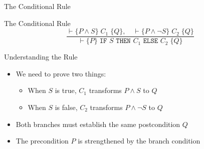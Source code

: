 \begin{frame}{The Conditional Rule}
    \begin{block}{The Conditional Rule}
        \[ \frac{\vdash \{P \wedge S\} \; C_1 \; \{Q\}, \quad \vdash \{P \wedge \neg S\} \; C_2 \; \{Q\}}{\vdash \{P\} \; \texttt{IF } S \texttt{ THEN } C_1 \texttt{ ELSE } C_2 \; \{Q\}} \]
    \end{block}
    
    \begin{block}{Understanding the Rule}
        \begin{itemize}
            \item We need to prove two things:
            \begin{itemize}
                \item When $S$ is true, $C_1$ transforms $P \wedge S$ to $Q$
                \item When $S$ is false, $C_2$ transforms $P \wedge \neg S$ to $Q$
            \end{itemize}
            \item Both branches must establish the same postcondition $Q$
            \item The precondition $P$ is strengthened by the branch condition
        \end{itemize}
    \end{block}
\end{frame}

